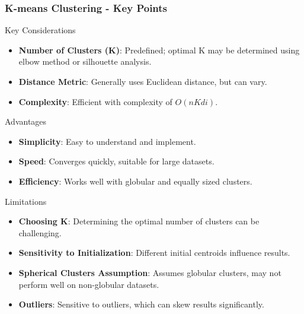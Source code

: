 \documentclass[aspectratio=169]{beamer}
\begin{document}
\begin{frame}[fragile]
    \frametitle{K-means Clustering - Key Points}
    \begin{block}{Key Considerations}
        \begin{itemize}
            \item \textbf{Number of Clusters (K)}: Predefined; optimal K may be determined using elbow method or silhouette analysis.
            \item \textbf{Distance Metric}: Generally uses Euclidean distance, but can vary.
            \item \textbf{Complexity}: Efficient with complexity of $O(nKdi)$.
        \end{itemize}
    \end{block}
    
    \begin{block}{Advantages}
        \begin{itemize}
            \item \textbf{Simplicity}: Easy to understand and implement.
            \item \textbf{Speed}: Converges quickly, suitable for large datasets.
            \item \textbf{Efficiency}: Works well with globular and equally sized clusters.
        \end{itemize}
    \end{block}
    
    \begin{block}{Limitations}
        \begin{itemize}
            \item \textbf{Choosing K}: Determining the optimal number of clusters can be challenging.
            \item \textbf{Sensitivity to Initialization}: Different initial centroids influence results.
            \item \textbf{Spherical Clusters Assumption}: Assumes globular clusters, may not perform well on non-globular datasets.
            \item \textbf{Outliers}: Sensitive to outliers, which can skew results significantly.
        \end{itemize}
    \end{block}
\end{frame}
\end{document}
